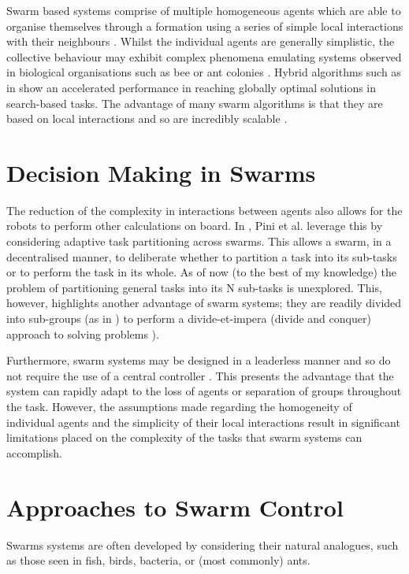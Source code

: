 \documentclass[../sample.tex]{subfiles}
\begin{document}
Swarm based systems comprise of multiple homogeneous agents which are able to organise themselves
through a formation using a series of simple local interactions with their neighbours
\cite{Couceiro2015}. Whilst the individual agents are generally simplistic, the collective behaviour
may exhibit complex phenomena emulating systems observed in biological organisations such as bee or
ant colonies \cite{Sethi2017}. Hybrid algorithms such as in \cite{Gao2018} show an accelerated
performance in reaching globally optimal solutions in search-based tasks. The advantage of many
swarm algorithms is that they are based on local interactions and so are incredibly scalable
\cite{Rizk2018}.

\section{Decision Making in Swarms}

The reduction of the complexity in interactions between agents also allows for the robots to perform
other calculations on board. In \cite{Pini2011TaskSelection}, Pini et al. leverage this by
considering adaptive task partitioning across swarms. This allows a swarm, in a decentralised
manner, to deliberate whether to partition a task into its sub-tasks or to perform the task in its
whole. As of now (to the best of my knowledge) the problem of partitioning general tasks into its N
sub-tasks is unexplored. This, however, highlights another advantage of swarm systems; they are
readily divided into sub-groups (as in \cite{Zahadat2016DivisionInhibition}) to perform a
divide-et-impera (divide and conquer) approach to solving problems \cite{Pini2011TaskSelection}). 

Furthermore, swarm systems may be designed in a leaderless manner and so do not require the use of a
central controller \cite{Couceiro2015}. This presents the advantage that the system can rapidly
adapt to the loss of agents or separation of groups throughout the task. However, the assumptions
made regarding the homogeneity of individual agents and the simplicity of their local interactions
result in significant limitations placed on the complexity of the tasks that swarm systems can
accomplish.

\section{Approaches to Swarm Control}

Swarms systems are often developed by considering their natural analogues, such as those seen in
fish, birds, bacteria, or (most commonly) ants. 
\end{document}
